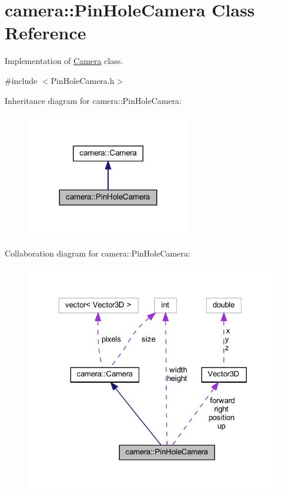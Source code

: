 \hypertarget{classcamera_1_1PinHoleCamera}{}\section{camera\+::Pin\+Hole\+Camera Class Reference}
\label{classcamera_1_1PinHoleCamera}


Implementation of \mbox{\hyperlink{classcamera_1_1Camera}{Camera}} class.  




{\ttfamily \#include $<$Pin\+Hole\+Camera.\+h$>$}



Inheritance diagram for camera\+::Pin\+Hole\+Camera\+:
\nopagebreak
\begin{figure}[H]
\begin{center}
\leavevmode
\includegraphics[width=204pt]{classcamera_1_1PinHoleCamera__inherit__graph}
\end{center}
\end{figure}


Collaboration diagram for camera\+::Pin\+Hole\+Camera\+:
\nopagebreak
\begin{figure}[H]
\begin{center}
\leavevmode
\includegraphics[width=324pt]{classcamera_1_1PinHoleCamera__coll__graph}
\end{center}
\end{figure}

